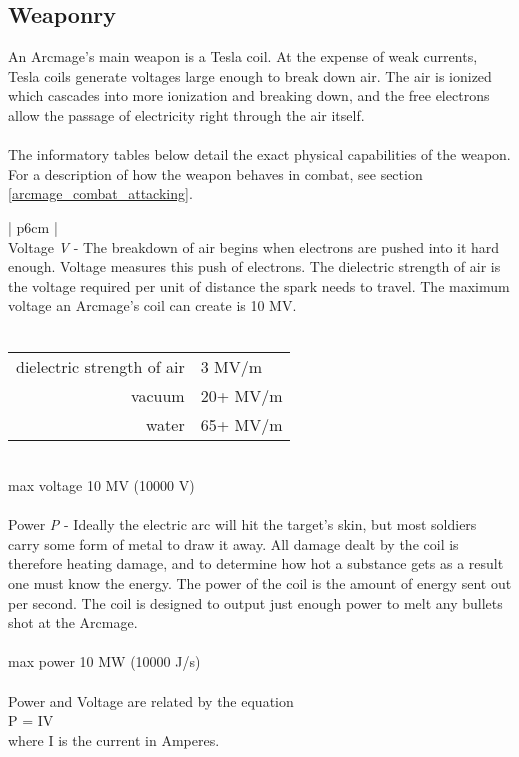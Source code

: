 \documentclass[a4paper]{article}
\begin{document}
\subsection{Weaponry} 

An Arcmage's main weapon is a Tesla coil. At the expense of weak currents, Tesla coils generate voltages large enough to break down air. The air is ionized which cascades into more ionization and breaking down, and the free electrons allow the passage of electricity right through the air itself. 
\\ \\
The informatory tables below detail the exact physical capabilities of the weapon. For a description of how the weapon behaves in combat, see section \ref{arcmage_combat_attacking}. 

\vspace{0.5cm}
\begin{minipage}[t]{0.45\linewidth}
\begin{tabular}[t]{| p{6cm} |}
\toprule
{} \\
\midrule 
Voltage \textit{V} - The breakdown of air begins when electrons are pushed into it hard enough. Voltage measures this push of electrons. The dielectric strength of air is the voltage required per unit of distance the spark needs to travel. The maximum voltage an Arcmage's coil can create is 10 MV. \\
\\
\begin{tabular}{r l}
dielectric strength of air & 3 MV/m \\
vacuum & 20+ MV/m \\
water & 65+ MV/m \\
\end{tabular}
\\
\hspace{0.2cm} max voltage 10 MV (10000 V) \\
\\
Power \textit{P} - Ideally the electric arc will hit the target's skin, but most soldiers carry some form of metal to draw it away. All damage dealt by the coil is therefore heating damage, and to determine how hot a substance gets as a result one must know the energy. The power of the coil is the amount of energy sent out per second. The coil is designed to output just enough power to melt any bullets shot at the Arcmage. \\
\\
\hspace{0.2cm} max power 10 MW (10000 J/s) \\
\\
Power and Voltage are related by the equation \\
\hspace{0.2cm} P = IV \\
where I is the current in Amperes. \\

\bottomrule
\end{tabular}
\end{minipage}
\end{document}
